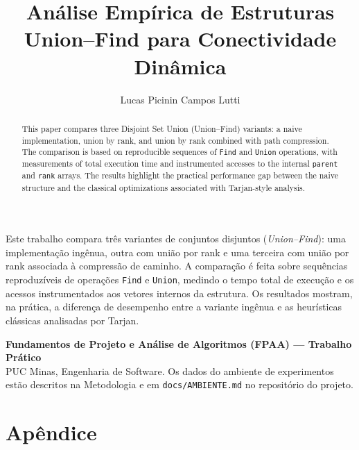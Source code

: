 \documentclass[12pt]{article}
\title{Análise Empírica de Estruturas Union--Find para Conectividade Dinâmica}
\author{Lucas Picinin Campos Lutti\inst{1} }
\begin{document}
 

\maketitle

\begin{abstract}
  This paper compares three Disjoint Set Union (Union--Find) variants: a naive implementation,
  union by rank, and union by rank combined with path compression. The comparison is based on
  reproducible sequences of \texttt{Find} and \texttt{Union} operations, with measurements of total
  execution time and instrumented accesses to the internal \texttt{parent} and \texttt{rank} arrays.
  The results highlight the practical performance gap between the naive structure and the
  classical optimizations associated with Tarjan-style analysis.
\end{abstract}
     
\begin{resumo} 
  Este trabalho compara três variantes de conjuntos disjuntos (\emph{Union--Find}): uma implementação
  ingênua, outra com união por rank e uma terceira com união por rank associada à compressão de caminho.
  A comparação é feita sobre sequências reproduzíveis de operações \texttt{Find} e \texttt{Union}, medindo
  o tempo total de execução e os acessos instrumentados aos vetores internos da estrutura.
  Os resultados mostram, na prática, a diferença de desempenho entre a variante ingênua e as
  heurísticas clássicas analisadas por Tarjan.
\end{resumo}


\begin{tcolorbox}
\footnotesize
\textbf{Fundamentos de Projeto e Análise de Algoritmos (FPAA) --- Trabalho Prático}\\
PUC Minas, Engenharia de Software. Os dados do ambiente de experimentos estão descritos na Metodologia e em \texttt{docs/AMBIENTE.md} no repositório do projeto.
\end{tcolorbox}












\appendix
\section*{Apêndice}

\end{document}
